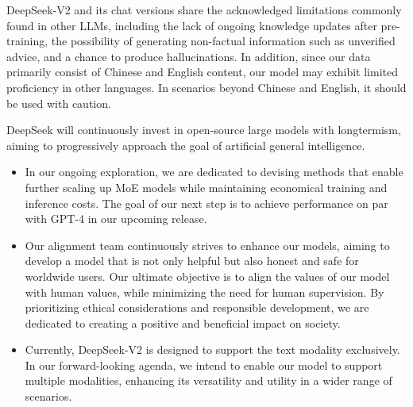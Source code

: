 DeepSeek-V2 and its chat versions share the acknowledged limitations commonly found in other LLMs, including the lack of ongoing knowledge updates after pre-training, the possibility of generating non-factual information such as unverified advice, and a chance to produce hallucinations. In addition, since our data primarily consist of Chinese and English content, our model may exhibit limited proficiency in other languages. In scenarios beyond Chinese and English, it should be used with caution.

DeepSeek will continuously invest in open-source large models with longtermism, aiming to progressively approach the goal of artificial general intelligence.

\begin{itemize}
    \item In our ongoing exploration, we are dedicated to devising methods that enable further scaling up MoE models while maintaining economical training and inference costs. The goal of our next step is to achieve performance on par with GPT-4 in our upcoming release.
    \item 
    Our alignment team continuously strives to enhance our models, aiming to develop a model that is not only helpful but also honest and safe for worldwide users. Our ultimate objective is to align the values of our model with human values, while minimizing the need for human supervision. By prioritizing ethical considerations and responsible development, we are dedicated to creating a positive and beneficial impact on society.  
    \item 
    Currently, DeepSeek-V2 is designed to support the text modality exclusively. In our forward-looking agenda, we intend to enable our model to support multiple modalities, enhancing its versatility and utility in a wider range of scenarios.
\end{itemize}


